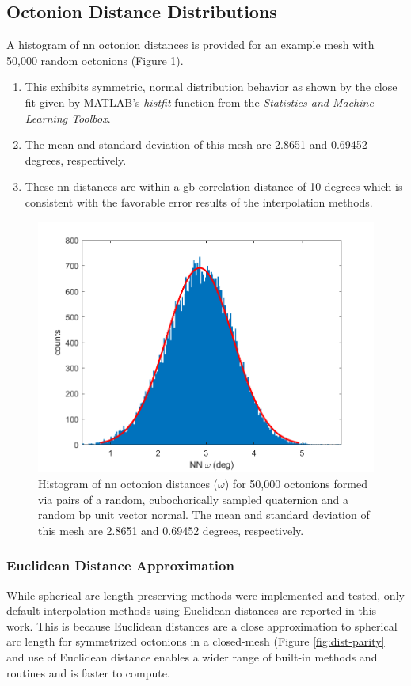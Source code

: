 \documentclass[preprint,12pt]{elsarticle}
\begin{document}
\subsection{Octonion Distance Distributions} \label{sec:results:dist}
A histogram of \gls{nn} octonion distances is provided for an example mesh with 50,000 random octonions (Figure \ref{fig:nndist}).
\begin{enumerate}
    \item This exhibits symmetric, normal distribution behavior as shown by the close fit given by MATLAB's \textit{histfit} function from the \textit{Statistics and Machine Learning Toolbox}.
    \item The mean and standard deviation of this mesh are 2.8651 and 0.69452 degrees, respectively.
    \item These \gls{nn} distances are within a \gls{gb} correlation distance of 10 degrees \cite{rohrerComparingCalculatedMeasured2010} which is consistent with the favorable error results of the interpolation methods.
\end{enumerate}

\begin{figure}
\centering
\includegraphics{disthist50000.png}
\caption{Histogram of \acrfull{nn} octonion distances ($\omega$) for 50,000 octonions formed via pairs of a random, cubochorically sampled quaternion and a random \acrfull{bp} unit vector normal. The mean and standard deviation of this mesh are 2.8651 and 0.69452 degrees, respectively.}
\label{fig:nndist}
\end{figure}

\subsubsection{Euclidean Distance Approximation}
While spherical-arc-length-preserving methods were implemented and tested, only default interpolation methods using Euclidean distances are reported in this work. This is because Euclidean distances are a close approximation to spherical arc length for symmetrized octonions in a closed-mesh (Figure \ref{fig:dist-parity} and use of Euclidean distance enables a wider range of built-in methods and routines and is faster to compute.
\end{document}
